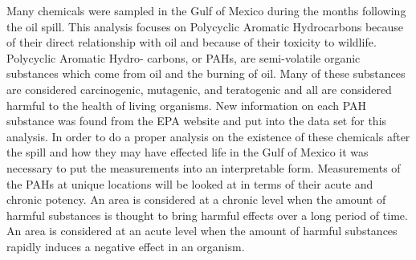 \documentclass[11pt]{article}
\begin{document}
Many chemicals were sampled in the Gulf of Mexico during the months following the oil spill. This analysis focuses on Polycyclic Aromatic Hydrocarbons because of their direct relationship with oil and because of their toxicity to wildlife. Polycyclic Aromatic Hydro- carbons, or PAHs, are semi-volatile organic substances which come from oil and the burning of oil. Many of these substances are considered carcinogenic, mutagenic, and teratogenic and all are considered harmful to the health of living organisms. New information on each PAH substance was found from the EPA website and put into the data set for this analysis. In order to do a proper analysis on the existence of these chemicals after the spill and how they may have effected life in the Gulf of Mexico it was necessary to put the measurements into an interpretable form. Measurements of the PAHs at unique locations will be looked at in terms of their acute and chronic potency. An area is considered at a chronic level when the amount of harmful substances is thought to bring harmful effects over a long period of time. An area is considered at an acute level when the amount of harmful substances rapidly induces a negative effect in an organism.
\end{document}
